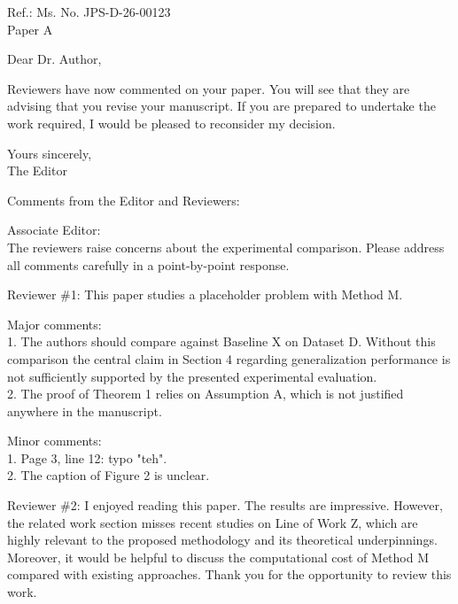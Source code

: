 \documentclass[11pt]{article}
\begin{document}
Ref.: Ms. No. JPS-D-26-00123\\
Paper A

Dear Dr. Author,

Reviewers have now commented on your paper. You will see that they are advising that you revise your manuscript. If you are prepared to undertake the work required, I would be pleased to reconsider my decision.

Yours sincerely,\\
The Editor

Comments from the Editor and Reviewers:

Associate Editor:\\
The reviewers raise concerns about the experimental comparison. Please address all comments carefully in a point-by-point response.

Reviewer \#1: This paper studies a placeholder problem with Method M.

Major comments:\\
1. The authors should compare against Baseline X on Dataset D. Without this comparison the central claim in Section 4 regarding generalization performance is not sufficiently supported by the presented experimental evaluation.\\
2. The proof of Theorem 1 relies on Assumption A, which is not justified anywhere in the manuscript.

Minor comments:\\
1. Page 3, line 12: typo "teh".\\
2. The caption of Figure 2 is unclear.

\newpage
Reviewer \#2: I enjoyed reading this paper. The results are impressive.
However, the related work section misses recent studies on Line of Work Z, which are highly relevant to the proposed methodology and its theoretical underpinnings.
Moreover, it would be helpful to discuss the computational cost of Method M compared with existing approaches.
Thank you for the opportunity to review this work.
\end{document}
